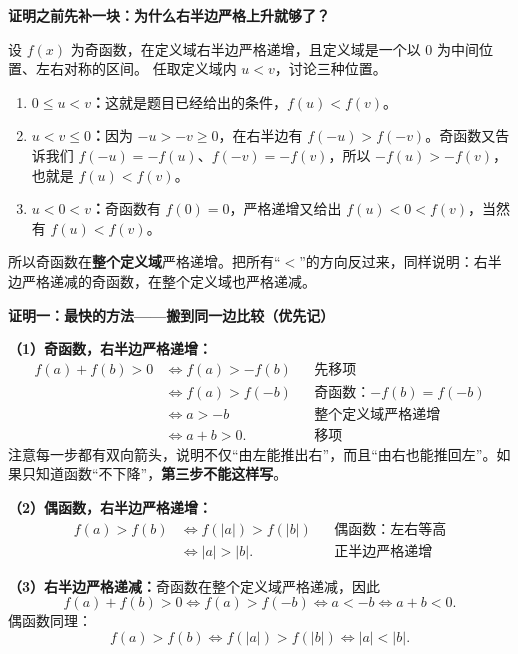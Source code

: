 \clearpage
\begin{proofbox}
\textbf{\textcolor{CProof}{证明之前先补一块：为什么右半边严格上升就够了？}}



设 $f(x)$ 为奇函数，在定义域右半边严格递增，且定义域是一个以 $0$ 为中间位置、左右对称的区间。
任取定义域内 $u<v$，讨论三种位置。
\begin{enumerate}[leftmargin=*,itemsep=0.3em]
  \item \textbf{$0\leqslant u<v$：}这就是题目已经给出的条件，$f(u)<f(v)$。
  \item \textbf{$u<v\leqslant0$：}因为 $-u>-v\geqslant0$，在右半边有 $f(-u)>f(-v)$。奇函数又告诉我们 $f(-u)=-f(u)$、$f(-v)=-f(v)$，所以 $-f(u)>-f(v)$，也就是 $f(u)<f(v)$。
  \item \textbf{$u<0<v$：}奇函数有 $f(0)=0$，严格递增又给出 $f(u)<0<f(v)$，当然有 $f(u)<f(v)$。
\end{enumerate}
所以奇函数在\textbf{整个定义域}严格递增。把所有“$<$”的方向反过来，同样说明：右半边严格递减的奇函数，在整个定义域也严格递减。

\medskip
\end{proofbox}\clearpage\begin{proofbox}\textbf{\textcolor{CProof}{证明一：最快的方法——搬到同一边比较（优先记）}}



\textbf{（1）奇函数，右半边严格递增：}
\[
\begin{aligned}
 f(a)+f(b)>0
 &\iff f(a)>-f(b) &&\text{先移项}\\
 &\iff f(a)>f(-b) &&\text{奇函数：$-f(b)=f(-b)$}\\
 &\iff a>-b &&\text{整个定义域严格递增}\\
 &\iff a+b>0. &&\text{移项}
\end{aligned}
\]
注意每一步都有双向箭头，说明不仅“由左能推出右”，而且“由右也能推回左”。如果只知道函数“不下降”，\textbf{第三步不能这样写}。

\textbf{（2）偶函数，右半边严格递增：}
\[
\begin{aligned}
 f(a)>f(b)
 &\iff f(|a|)>f(|b|) &&\text{偶函数：左右等高}\\
 &\iff |a|>|b|. &&\text{正半边严格递增}
\end{aligned}
\]

\textbf{（3）右半边严格递减：}奇函数在整个定义域严格递减，因此
\[
 f(a)+f(b)>0\iff f(a)>f(-b)\iff a<-b\iff a+b<0.
\]
偶函数同理：
\[
 f(a)>f(b)\iff f(|a|)>f(|b|)\iff |a|<|b|.
\]

\medskip

\end{proofbox}
